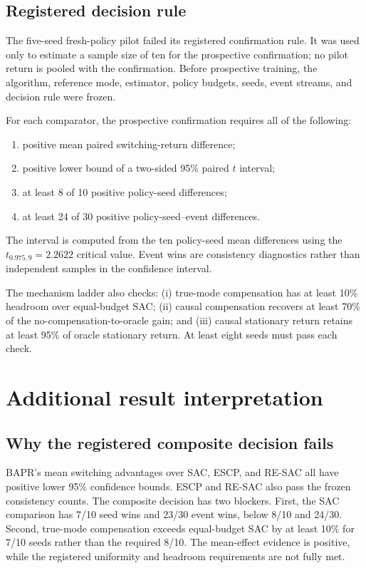 \subsection{Registered decision rule}

The five-seed fresh-policy pilot failed its registered confirmation rule. It was used only to estimate a sample size of ten for the prospective confirmation; no pilot return is pooled with the confirmation. Before prospective training, the algorithm, reference mode, estimator, policy budgets, seeds, event streams, and decision rule were frozen.

For each comparator, the prospective confirmation requires all of the following:
\begin{enumerate}[leftmargin=*]
    \item positive mean paired switching-return difference;
    \item positive lower bound of a two-sided 95\% paired $t$ interval;
    \item at least 8 of 10 positive policy-seed differences;
    \item at least 24 of 30 positive policy-seed--event differences.
\end{enumerate}
The interval is computed from the ten policy-seed mean differences using the $t_{0.975,9}=2.2622$ critical value. Event wins are consistency diagnostics rather than independent samples in the confidence interval.

The mechanism ladder also checks: (i) true-mode compensation has at least 10\% headroom over equal-budget SAC; (ii) causal compensation recovers at least 70\% of the no-compensation-to-oracle gain; and (iii) causal stationary return retains at least 95\% of oracle stationary return. At least eight seeds must pass each check.

\section{Additional result interpretation}
\label{app:additional_results}

\subsection{Why the registered composite decision fails}

BAPR's mean switching advantages over SAC, ESCP, and RE-SAC all have positive lower 95\% confidence bounds. ESCP and RE-SAC also pass the frozen consistency counts. The composite decision has two blockers. First, the SAC comparison has 7/10 seed wins and 23/30 event wins, below 8/10 and 24/30. Second, true-mode compensation exceeds equal-budget SAC by at least 10\% for 7/10 seeds rather than the required 8/10. The mean-effect evidence is positive, while the registered uniformity and headroom requirements are not fully met.

